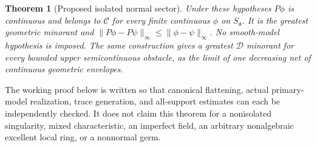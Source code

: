 \documentclass[11pt]{article}
\newtheorem{theorem}{Theorem}[section]
\newcommand{\CC}{\mathcal C}
\newcommand{\DD}{\mathcal D}
\begin{document}
\begin{theorem}[Proposed isolated normal sector]\label{thm:main}
Under these hypotheses $P\phi$ is continuous and belongs to $\CC$ for every
finite continuous $\phi$ on $S_{\mathfrak a}$. It is the greatest geometric
minorant and
$\|P\phi-P\psi\|_\infty\leq\|\phi-\psi\|_\infty$.
No smooth-model hypothesis is imposed. The same construction gives a
greatest $\DD$ minorant for every bounded upper semicontinuous obstacle,
as the limit of one decreasing net of continuous geometric envelopes.
\end{theorem}

The working proof below is written so that canonical flattening, actual
primary-model realization, trace generation, and all-support estimates can
each be independently checked. It does not claim this theorem for a
nonisolated singularity, mixed characteristic, an imperfect field, an arbitrary
nonalgebraic excellent local ring, or a nonnormal germ.
\end{document}
